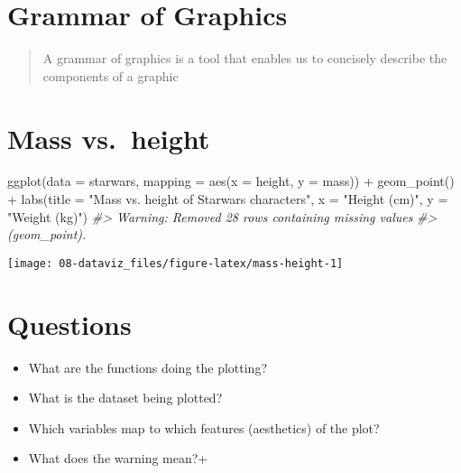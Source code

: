 \documentclass[
]{book}
\newenvironment{Shaded}{\begin{snugshade}}{\end{snugshade}}
\newcommand{\AttributeTok}[1]{\textcolor[rgb]{0.77,0.63,0.00}{#1}}
\newcommand{\CommentTok}[1]{\textcolor[rgb]{0.56,0.35,0.01}{\textit{#1}}}
\newcommand{\FunctionTok}[1]{\textcolor[rgb]{0.00,0.00,0.00}{#1}}
\newcommand{\NormalTok}[1]{#1}
\newcommand{\SpecialCharTok}[1]{\textcolor[rgb]{0.00,0.00,0.00}{#1}}
\newcommand{\StringTok}[1]{\textcolor[rgb]{0.31,0.60,0.02}{#1}}
\providecommand{\tightlist}{%
  \setlength{\itemsep}{0pt}\setlength{\parskip}{0pt}}
\theoremstyle{definition}
\theoremstyle{definition}
\theoremstyle{definition}
\theoremstyle{definition}
\theoremstyle{remark}
\begin{document}
\hypertarget{grammar-of-graphics}{%
\section{Grammar of Graphics}\label{grammar-of-graphics}}

\begin{quote}
A grammar of graphics is a tool that enables us to concisely describe the components of a graphic
\end{quote}

\hypertarget{mass-vs.-height-1}{%
\section{Mass vs.~height}\label{mass-vs.-height-1}}

\begin{Shaded}
\begin{Highlighting}[]
\FunctionTok{ggplot}\NormalTok{(}\AttributeTok{data =}\NormalTok{ starwars, }\AttributeTok{mapping =} \FunctionTok{aes}\NormalTok{(}\AttributeTok{x =}\NormalTok{ height, }\AttributeTok{y =}\NormalTok{ mass)) }\SpecialCharTok{+}
  \FunctionTok{geom\_point}\NormalTok{() }\SpecialCharTok{+}
  \FunctionTok{labs}\NormalTok{(}\AttributeTok{title =} \StringTok{"Mass vs. height of Starwars characters"}\NormalTok{,}
       \AttributeTok{x =} \StringTok{"Height (cm)"}\NormalTok{, }\AttributeTok{y =} \StringTok{"Weight (kg)"}\NormalTok{)}
\CommentTok{\#\textgreater{} Warning: Removed 28 rows containing missing values}
\CommentTok{\#\textgreater{} (geom\_point).}
\end{Highlighting}
\end{Shaded}

\begin{center}\texttt{[image: 08-dataviz\_files/figure-latex/mass-height-1]} \end{center}

\hypertarget{questions-2}{%
\section{Questions}\label{questions-2}}

\begin{itemize}
\tightlist
\item
  What are the functions doing the plotting?
\item
  What is the dataset being plotted?
\item
  Which variables map to which features (aesthetics) of the plot?
\item
  What does the warning mean?+
\end{itemize}
\end{document}
